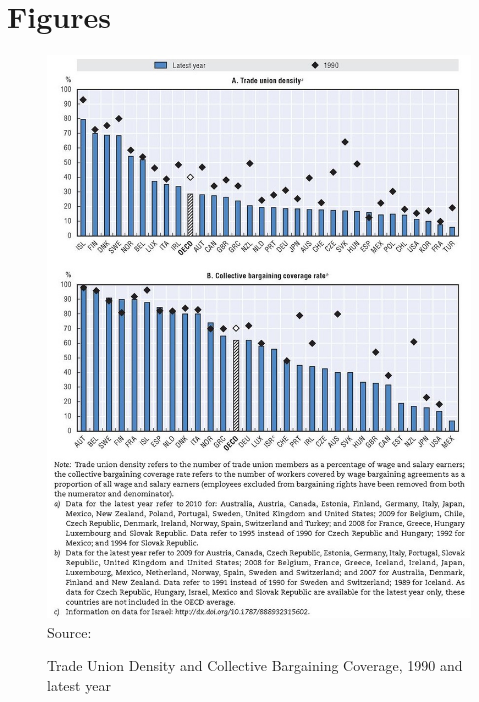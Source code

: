 \section{Figures}

\begin{figure}[H]
  \begin{center}
   \caption{Trade Union Density and Collective Bargaining Coverage, 1990 and latest year}
   \bigskip
    \includegraphics[width=135mm,scale=0.5]{UDandCC2}\\
    \label{Fig:UDandCC2}
    \footnotesize Source: \cite[p.~136]{OECD:12}
  \end{center}
\end{figure}

